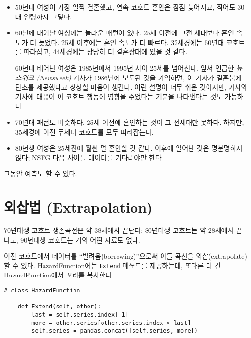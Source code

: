 \begin{itemize}

\item 50년대 여성이 가장 일찍 결혼했고, 연속 코호트 혼인은 점점 늦어지고, 적어도 30대 연령까지 그렇다.

\item 60년에 태어난 여성에는 놀라운 패턴이 있다.
25세 이전에 그전 세대보다 혼인 속도가 더 늦었다. 25세 이후에는 혼인 속도가 더 빠르다. 32세경에는 50년대 코호트를 따라잡고, 44세경에는 상당히 더 결혼상태에 있을 것 같다.

60년대 태어난 여성은 1985년에서 1995년 사이 25세를 넘어선다.
앞서 언급한 {\it 뉴스위크 (Newsweek)} 기사가 1986년에 보도된 것을 기억하면, 이 기사가 결혼붐에 단초를 제공했다고 상상할 마음이 생긴다. 
이런 설명이 너무 쉬운 것이지만, 기사와 기사에 대응이 이 코호트 행동에 영향을 주었다는 기분을 나타낸다는 것도 가능하다.

\item 70년대 패턴도 비슷하다. 25세 이전에 혼인하는 것이 그 전세대만 못하다. 하지만, 35세경에 이전 두세대 코호트를 모두 따라잡는다.

\item 80년생 여성은 25세전에 훨씬 덜 혼인할 것 같다. 이후에 일어난 것은 명분명하지 않다; NSFG 다음 사이틀 데이터를 기다려야만 한다.

\end{itemize}

그동안 예측도 할 수 있다.


\section{외삽법 (Extrapolation)}

70년대생 코호트 생존곡선은 약 38세에서 끝난다; 80년대생 코호트는 약 28세에서 끝나고, 90년대생 코호트는 거의 어떤 자료도 없다.

이전 코호트에서 데이터를 ``빌려옴(borrowing)''으로써 이들 곡선을 외삽(extrapolate)할 수 있다. 
HazardFunction에는 {\tt Extend} 메쏘드를 제공하는데, 또다른 더 긴 HazardFunction에서 꼬리를 복사한다.

\begin{verbatim}
# class HazardFunction

    def Extend(self, other):
        last = self.series.index[-1]
        more = other.series[other.series.index > last]
        self.series = pandas.concat([self.series, more])
\end{verbatim}

